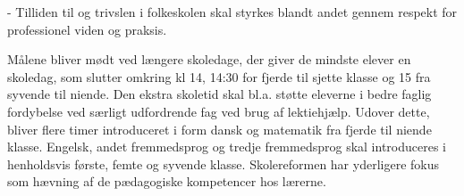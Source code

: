-	Tilliden til og trivslen i folkeskolen skal styrkes blandt andet gennem respekt for professionel viden og praksis.

Målene bliver mødt ved længere skoledage, der giver de mindste elever en skoledag, som slutter omkring kl 14, 14:30 for fjerde til sjette klasse og 15 fra syvende til niende. Den ekstra skoletid skal bl.a. støtte eleverne i bedre faglig fordybelse ved særligt udfordrende fag ved brug af lektiehjælp. Udover dette, bliver flere timer introduceret i form dansk og matematik fra fjerde til niende klasse. Engelsk, andet fremmedsprog og tredje fremmedsprog skal introduceres i henholdsvis første, femte og syvende klasse. \cite{dennyefolkeskole}
Skolereformen har yderligere fokus som hævning af de pædagogiske kompetencer hos lærerne.

